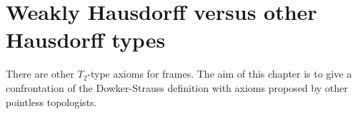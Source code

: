 \chapter{Weakly Hausdorff versus other Hausdorff types}

There are other $T_2$-type axioms for frames.
The aim of this chapter is to give a confrontation of the Dowker-Strauss
definition with axioms proposed by other pointless topologists.

